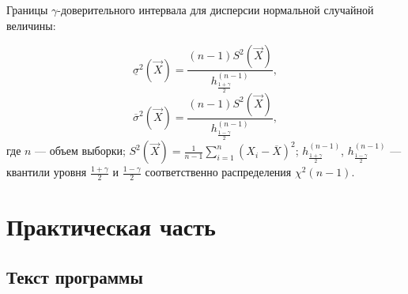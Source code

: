 Границы $\gamma$-доверительного интервала для дисперсии нормальной случайной величины:

\begin{equation}
	\underline{\sigma}^2(\vec X) = \frac{(n - 1)S^2(\vec X)}{h^{(n - 1)}_{\frac{1 + \gamma}{2}}},
\end{equation}
\begin{equation}
	\overline{\sigma}^2(\vec X) = \frac{(n - 1)S^2(\vec X)}{h^{(n - 1)}_{\frac{1 - \gamma}{2}}},
\end{equation}
где $n$ --- объем выборки; $S^2(\vec X) = \frac{1}{n-1} \sum_{i=1}^n (X_i - \overline X)^2$; $h^{(n - 1)}_{\frac{1 + \gamma}{2}}$, $h^{(n - 1)}_{\frac{1 - \gamma}{2}}$ --- квантили уровня $\frac{1 + \gamma}{2}$ и $\frac{1 - \gamma}{2}$ соответственно распределения $\chi^2(n - 1)$.

\chapter{Практическая часть}

\section{Текст программы}


